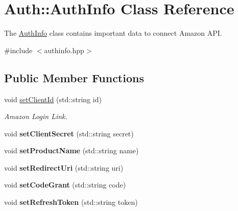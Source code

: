 \hypertarget{classAuth_1_1AuthInfo}{}\section{Auth\+:\+:Auth\+Info Class Reference}
\label{classAuth_1_1AuthInfo}


The \hyperlink{classAuth_1_1AuthInfo}{Auth\+Info} class contains important data to connect Amazon A\+PI.  




{\ttfamily \#include $<$authinfo.\+hpp$>$}

\subsection*{Public Member Functions}
\begin{DoxyCompactItemize}
\item 
void \hyperlink{classAuth_1_1AuthInfo_a5de00b6ffe9720a53ad2627fd78c4f47}{set\+Client\+Id} (std\+::string id)
\begin{DoxyCompactList}\small\item\em Amazon Login Link. \end{DoxyCompactList}\item 
\mbox{\label{classAuth_1_1AuthInfo_aec30a55883de170a521fb998624b5fc1}} 
void {\bfseries set\+Client\+Secret} (std\+::string secret)
\item 
\mbox{\label{classAuth_1_1AuthInfo_af3190f66ac7f78db1c27484755b13c89}} 
void {\bfseries set\+Product\+Name} (std\+::string name)
\item 
\mbox{\label{classAuth_1_1AuthInfo_acd647f584c363e4ba256b5cfd5dd0f4a}} 
void {\bfseries set\+Redirect\+Uri} (std\+::string uri)
\item 
\mbox{\label{classAuth_1_1AuthInfo_a8c092072b1a7a0aa2b4a0376ae39ad83}} 
void {\bfseries set\+Code\+Grant} (std\+::string code)
\item 
\mbox{\label{classAuth_1_1AuthInfo_af1bd54d97de21ec565b9a971f5b1a787}} 
void {\bfseries set\+Refresh\+Token} (std\+::string token)
\item 
\mbox{\label{classAuth_1_1AuthInfo_abcd384461140303298421591573d36fb}} 

\end{DoxyCompactItemize}
